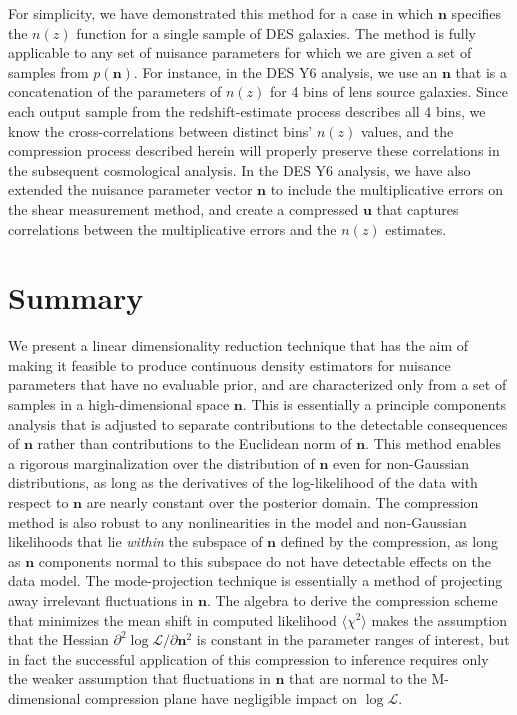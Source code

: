 \documentclass[onecolumn,resetfootnote]{aastex7}
\newcommand{\vecn}{\ensuremath{\mathbf{n}}}
\newcommand{\vecu}{\ensuremath{\mathbf{u}}}
\newcommand{\likeli}{\mathcal{L}}
\begin{document}
For simplicity, we have demonstrated this method for a case in which
$\vecn$ specifies the $n(z)$ function for a single sample of DES
galaxies.  The method is fully applicable to any set of nuisance
parameters for which we are given a set of samples from $p(\vecn).$
For instance, in the DES Y6 analysis, we use an $\vecn$ that is a
concatenation of the parameters of $n(z)$ for 4 bins of lens source
galaxies.  Since each output sample from the  redshift-estimate
process describes all 4 bins, we know the cross-correlations between
distinct bins' $n(z)$ values, and the compression process described
herein will properly preserve these correlations in the subsequent
cosmological analysis.  In the DES Y6 analysis, we have also extended
the nuisance parameter vector $\vecn$ to include the multiplicative
errors on the shear measurement method, and create a compressed
$\vecu$ that captures correlations between the multiplicative errors
and the $n(z)$ estimates.

\section{Summary}
  We present a linear dimensionality reduction technique that has the
  aim of making it feasible to produce continuous density estimators
  for nuisance parameters that have no evaluable prior, and are characterized only
  from a set of samples in 
  a high-dimensional space $\vecn.$  This is essentially a principle
  components analysis that is adjusted to separate contributions to
  the detectable consequences of $\vecn$ rather than contributions to
  the Euclidean norm of $\vecn.$   This method enables a rigorous
  marginalization over the distribution of $\vecn$ even for
  non-Gaussian distributions, as long as the derivatives of the
  log-likelihood of the data with respect to $\vecn$ are nearly
  constant over the posterior domain.
  The compression method is also robust to any nonlinearities
    in the model and non-Gaussian likelihoods that lie \emph{within} the
    subspace of $\vecn$ defined 
    by the compression, as long as $\vecn$ components normal to this
    subspace do not have detectable effects on the data model.
 The mode-projection technique
  is essentially a method of projecting away irrelevant
  fluctuations in $\vecn.$
The algebra to derive the compression scheme that minimizes the mean shift
  in computed likelihood $\langle  \chi^2\rangle$ makes the assumption that the
  Hessian $\partial^2 \log\likeli / \partial\vecn^2$ is constant in the
  parameter ranges of interest, but in fact the successful application of this
  compression  to inference requires only the weaker assumption that
  fluctuations in $\vecn$ that are normal to the M-dimensional compression plane
  have   negligible impact on $\log\likeli.$
\end{document}
